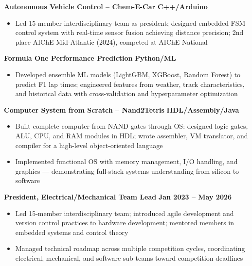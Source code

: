 \documentclass{article}
\begin{document}
\textbf{Autonomous Vehicle Control – Chem-E-Car} \hfill \textbf{C++/Arduino}
\begin{itemize}[noitemsep,topsep=2pt]
    \item Led 15-member interdisciplinary team as president; designed embedded FSM control system with real-time sensor fusion achieving  distance precision; 2nd place AIChE Mid-Atlantic (2024), competed at AIChE National
\end{itemize}

\textbf{Formula One Performance Prediction} \hfill \textbf{Python/ML}
\begin{itemize}[noitemsep,topsep=2pt]
    \item Developed ensemble ML models (LightGBM, XGBoost, Random Forest) to predict F1 lap times; engineered features from weather, track characteristics, and historical data with cross-validation and hyperparameter optimization
\end{itemize}

\textbf{Computer System from Scratch – Nand2Tetris} \hfill \textbf{HDL/Assembly/Java}
\begin{itemize}[noitemsep,topsep=2pt]
    \item Built complete computer from NAND gates through OS: designed logic gates, ALU, CPU, and RAM modules in HDL; wrote assembler, VM translator, and compiler for a high-level object-oriented language
    \item Implemented functional OS with memory management, I/O handling, and graphics — demonstrating full-stack systems understanding from silicon to software
\end{itemize}


 \hfill {}

\textbf{President, Electrical/Mechanical Team Lead} \hfill \textbf{Jan 2023 – May 2026}
\begin{itemize}[noitemsep,topsep=2pt]
    \item Led 15-member interdisciplinary team; introduced agile development and version control practices to hardware development; mentored members in embedded systems and control theory
    \item Managed technical roadmap across multiple competition cycles, coordinating electrical, mechanical, and software sub-teams toward competition deadlines
\end{itemize}
\end{document}
